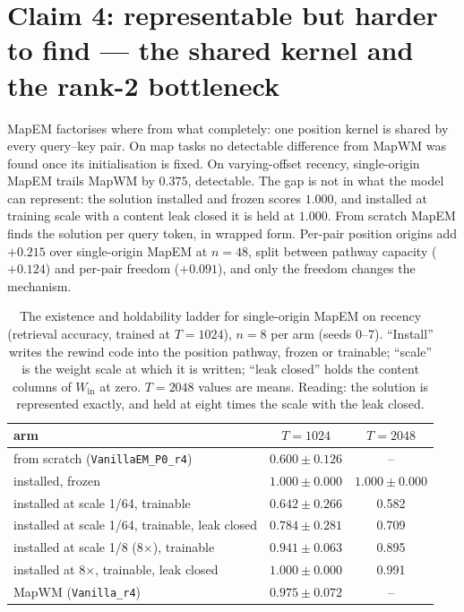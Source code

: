 \documentclass[10pt]{article}
\newcommand{\arm}[1]{\texttt{#1}}
\begin{document}
\section{Claim 4: representable but harder to find --- the shared kernel and the rank-2 bottleneck}
\label{sec:claim4}

MapEM factorises where from what completely: one position kernel is shared by every query--key pair. On map tasks
no detectable difference from MapWM was found once its initialisation is fixed. On varying-offset recency,
single-origin MapEM trails MapWM by $0.375$, detectable. The gap is not in what the model can represent:
the solution installed and frozen scores $1.000$, and installed at training scale with a content
leak closed it is held at $1.000$. From scratch MapEM finds the solution per query token, in wrapped form.
Per-pair position origins add $+0.215$ over single-origin MapEM at $n=48$, split between pathway capacity
($+0.124$) and per-pair freedom ($+0.091$), and only the freedom changes the mechanism.

\begin{table}[t]
\centering
\small
\captionsetup{font=footnotesize,skip=4pt}
\caption{The existence and holdability ladder for single-origin MapEM on recency (retrieval accuracy, trained at $T=1024$), $n=8$ per arm (seeds 0--7). ``Install'' writes the rewind code into the position pathway, frozen or trainable; ``scale'' is the weight scale at which it is written; ``leak closed'' holds the content columns of $W_{\mathrm{in}}$ at zero. $T=2048$ values are means. Reading: the solution is represented exactly, and held at eight times the scale with the leak closed.}
\label{tab:ladder}
\begin{tabular}{@{}lcc@{}}
\toprule
arm & $T=1024$ & $T=2048$ \\
\midrule
from scratch (\arm{VanillaEM\_P0\_r4})          & $0.600\pm0.126$ & -- \\
installed, frozen                                & $1.000\pm0.000$ & $1.000\pm0.000$ \\
installed at scale 1/64, trainable               & $0.642\pm0.266$ & 0.582 \\
installed at scale 1/64, trainable, leak closed  & $0.784\pm0.281$ & 0.709 \\
installed at scale 1/8 (8$\times$), trainable    & $0.941\pm0.063$ & 0.895 \\
installed at 8$\times$, trainable, leak closed   & $1.000\pm0.000$ & 0.991 \\
MapWM (\arm{Vanilla\_r4})                        & $0.975\pm0.072$ & -- \\
\bottomrule
\end{tabular}
\end{table}
\end{document}
